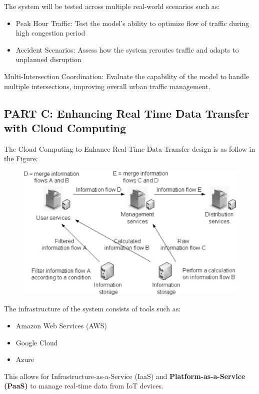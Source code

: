 \documentclass[12pt,a4paper]{article}
\begin{document}
The system will be tested across multiple real-world scenarios such as: 

\begin{itemize}
    \item Peak Hour Traffic: Test the model’s ability to optimize flow of traffic during high congestion period 

    \item Accident Scenarios: Assess how the system reroutes traffic and adapts to unplanned disruption 
\end{itemize}

Multi-Intersection Coordination: Evaluate the capability of the model to handle multiple intersections, improving overall urban traffic management. 

\newpage

\subsection{PART C: Enhancing Real Time Data Transfer with Cloud Computing }

The Cloud Computing to Enhance Real Time Data Transfer design is as follow in the Figure:

\begin{figure}[h]
    \centering
    \includegraphics[width=0.5\linewidth]{photo_2024-09-25_11-13-11.jpg}

\end{figure}

The infrastructure of the system consists of tools such as: 

\begin{itemize}
    \item Amazon Web Services (AWS)  

    \item Google Cloud  

    \item Azure
\end{itemize}

This allows for \textbf{}Infrastructure-as-a-Service (IaaS) and \textbf{Platform-as-a-Service (PaaS)} to manage real-time data from IoT devices. \\
\end{document}
